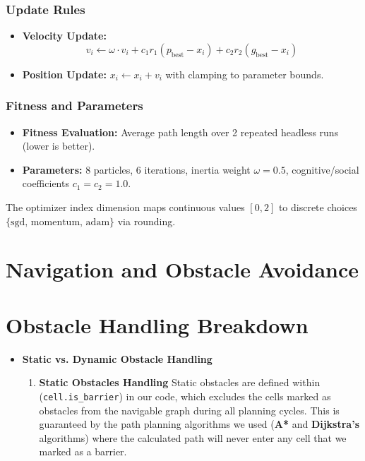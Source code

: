 \documentclass[12pt,a4paper]{report}
\begin{document}
\begin{itemize}
\begin{itemize}
\begin{itemize}
\begin{itemize}
\subsubsection*{Update Rules}
\begin{itemize}
    \item \textbf{Velocity Update:} 
    $$v_i \leftarrow \omega \cdot v_i + c_1 r_1 (p_{\text{best}} - x_i) + c_2 r_2 (g_{\text{best}} - x_i)$$
    \item \textbf{Position Update:} $x_i \leftarrow x_i + v_i$ with clamping to parameter bounds.
\end{itemize}

\subsubsection*{Fitness and Parameters}
\begin{itemize}
    \item \textbf{Fitness Evaluation:} Average path length over 2 repeated headless runs (lower is better).
    \item \textbf{Parameters:} 8 particles, 6 iterations, inertia weight $\omega=0.5$, cognitive/social coefficients $c_1=c_2=1.0$.
\end{itemize}

The optimizer index dimension maps continuous values $[0, 2]$ to discrete choices $\{\text{sgd, momentum, adam}\}$ via rounding.

\section{Navigation and Obstacle Avoidance}
\section*{Obstacle Handling Breakdown}

\begin{itemize}
    \item \textbf{Static vs. Dynamic Obstacle Handling}

    \begin{enumerate}
        \item \textbf{Static Obstacles Handling}
        Static obstacles are defined within (\texttt{cell.is\_barrier}) in our code, which excludes the cells marked as obstacles from the navigable graph during all planning cycles. This is guaranteed by the path planning algorithms we used (\textbf{A*} and \textbf{Dijkstra's} algorithms) where the calculated path will never enter any cell that we marked as a barrier.
        

\end{enumerate}
\end{itemize}
\end{itemize}
\end{itemize}
\end{itemize}
\end{itemize}
\end{document}
